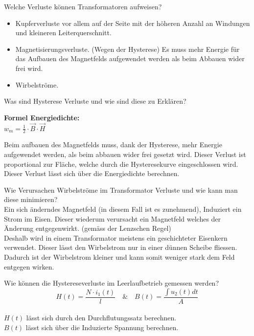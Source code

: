 \begin{karte}{Welche Verluste können Transformatoren aufweisen?}
	\begin{itemize}
		\item Kupferverluste vor allem auf der Seite mit der höheren Anzahl an Windungen und kleineren Leiterquerschnitt.
		\item Magnetisierungsverluste. (Wegen der Hysterese) Es muss mehr Energie für das Aufbauen des Magnetfelds aufgewendet werden als beim Abbauen wider frei wird.
		\item Wirbelströme.
	\end{itemize}
\end{karte}

\begin{karte}{Was sind Hysterese Verluste und wie sind diese zu Erklären?}
	\begin{minipage}{0.49\textwidth}
		
	\end{minipage}
	\begin{minipage}{0.49\textwidth}
		\textbf{Formel Energiedichte:}\\[10pt]
		$
			w_m = \frac{1}{2} \cdot \vec{B} \cdot \vec{H}
		$
	\end{minipage}
	Beim aufbauen des Magnetfelds muss, dank der Hysterese, mehr Energie aufgewendet werden, als beim abbauen wider frei gesetzt wird. Dieser Verlust ist proportional zur Fläche, welche durch die Hysteresekurve eingeschlossen wird. Dieser Verlust lässt sich über die Energiedichte berechnen.
\end{karte}

\begin{karte}{Wie Verursachen Wirbelströme im Transformator Verluste und wie kann man diese minimieren?}
	\\[5pt]
	Ein sich änderndes Magnetfeld (in diesem Fall ist es zunehmend), Induziert ein Strom im Eisen. Dieser wiederum verursacht ein Magnetfeld welches der Änderung entgegenwirkt. (gemäss der Lenzschen Regel)\\[5pt]
	Deshalb wird in einem Transformator meistens ein geschichteter Eisenkern verwendet. Dieser lässt den Wirbelstrom nur in einer dünnen Scheibe fliessen. Dadurch ist der Wirbelstrom kleiner und kann somit weniger stark dem Feld entgegen wirken. 
\end{karte}

\begin{karte}{Wie können die Hystereseverluste im Leerlaufbetrieb gemessen werden?}
	\\
	\begin{equation*}
		H(t) = \frac{N\cdot i_1(t)}{l}  
		\quad \& \quad 
		B(t) = \frac{\int u_2(t) dt}{A}
	\end{equation*}\\[2pt]
	$H(t)$ lässt sich durch den Durchflutungssatz berechnen.\\
	$B(t)$ lässt sich über die Induzierte Spannung berechnen.\\ 
\end{karte}


